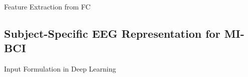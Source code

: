 \documentclass[aspectratio=169]{beamer}
\begin{document}
\begin{frame}{Feature Extraction from FC}
    \begin{figure}[!ht]
        \centering
    \end{figure}
\end{frame}


\subsection{Subject-Specific EEG Representation for MI-BCI}


\begin{frame}{Input Formulation in Deep Learning}
    \begin{figure}[!ht]
        \centering
    \end{figure}
\end{frame}
\end{document}
